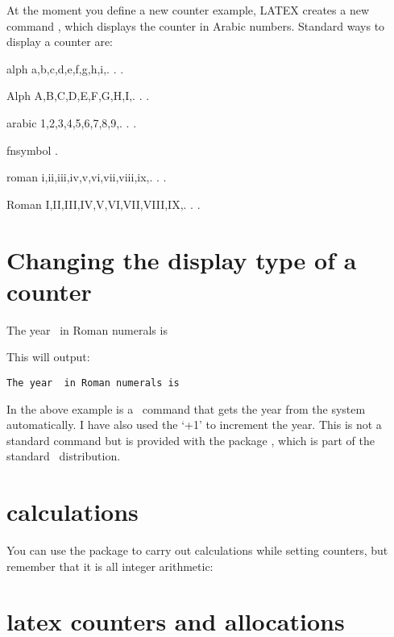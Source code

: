 At the moment you define a new counter example, LATEX creates a
new command , which displays the counter in Arabic
numbers. Standard ways to display a counter are:

alph a,b,c,d,e,f,g,h,i,. . .

Alph A,B,C,D,E,F,G,H,I,. . .

arabic 1,2,3,4,5,6,7,8,9,. . .

fnsymbol .

roman i,ii,iii,iv,v,vi,vii,viii,ix,. . .

Roman I,II,III,IV,V,VI,VII,VIII,IX,. . .

\section{Changing the display type of a counter}

\begin{teX}
\setcounter{RomanYear}{\year+1}

The year \theRomanYear\  in Roman numerals is 
\end{teX}
\medskip

This will output:

\setcounter{RomanYear}{\year+1}
\texttt{The year \theRomanYear\  in Roman numerals is }

In the above example  is a \tex\ command that gets the year from the
system automatically. I have also used the `+1' to increment the year. This is not a standard command but is provided
with the package , which is part of the standard \latex\ distribution.

\section{calculations}

You can use the package  to carry out calculations while setting counters, but remember that it is all integer arithmetic:

\begin{teX}
\setcounter{X}{(7/2)+1}
\theX\relax
\end{teX}


\section{latex counters and allocations}


